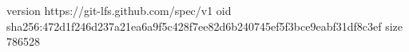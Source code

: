 version https://git-lfs.github.com/spec/v1
oid sha256:472d1f246d237a21ea6a9f5c428f7ee82d6b240745ef5f3bce9eabf31df8c3ef
size 786528
